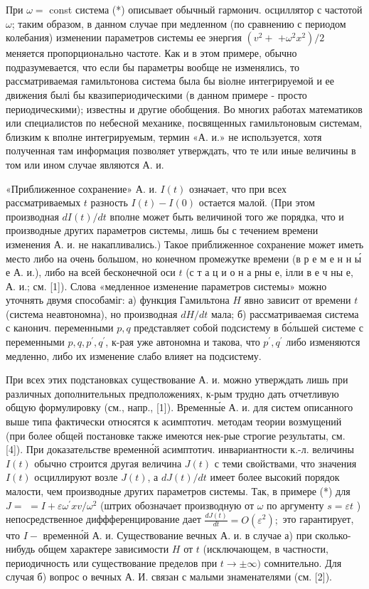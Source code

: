 \documentclass[10pt]{article}
\begin{document}
При $\omega=$ const система (*) описывает обычный гармонич. осциллятор с частотой $\omega$; таким образом, в данном случае при медленном (по сравнению с периодом колебания) изменении параметров системы ее энергия $\left(v^{2}+\right.$ $\left.+\omega^{2} x^{2}\right) / 2$ меняется пропорционально частоте. Как и в этом примере, обычно подразумевается, что если бы параметры вообще не изменялись, то рассматриваемая гамильтонова система была бы віолне интегрируемой и ее движения былі бы квазипериодическими (в данном примере - просто периодическими); известны и другие обобщения. Во многих работах математиков или специалистов по небесной механике, посвященных гамильтоновым системам, близким к вполне интегрируемым, термин «А. и.» не используется, хотя полученная там информация позволяет утверждать, что те или иные величины в том или ином случае являются А. и.



«Приближенное сохранение» А. и. $I(t)$ означает, что при всех рассматриваемых $t$ разность $I(t)-I(0)$ остается малой. (При этом производная $d I(t) / d t$ вполне может быть величиной того же порядка, что и производные других параметров системы, лишь бы с течением времени изменения А. и. не накапливались.) Такое приближенное сохранение может иметь место либо на очень большом, но конечном промежутке времени (в р е м е н н ы́ е А. и.), либо на всей бесконечной оси $t$ (с т а ц и о н а рны е, ілли в е ч ны е, А. и.; см. [1]). Слова «медленное изменение параметров системы» можно уточнять двумя способаміг: а) функция Гамильтона $H$ явно зависит от времени $t$ (система неавтономна), но производная $d H / d t$ мала; б) рассматриваемая система с канонич. переменными $p, q$ представляет собой подсистему в бо́льшей системе с переменными $p, q, p^{\prime}, q^{\prime}$, к-рая уже автономна и такова, что $p^{\prime}, q^{\prime}$ либо изменяются медленно, либо их изменение слабо влияет на подсистему.



При всех этих подстановках существование А. и. можно утверждать лишь при различных дополнительных предположениях, к-рым трудно дать отчетливую общую формулировку (см., напр., [1]). Временны́е А. и. для систем описанного выше типа фактически относятся к асимптотич. методам теории возмущений (при более общей постановке также имеются нек-рые строгие результаты, см. [4]). При доказательстве временно́й асимптотич. инвариантности к.-л. величины $I(t)$ обычно строится другая величина $J(t)$ с теми свойствами, что значения $I(t)$ осциллируют возле $J(t)$, а $d J(t) / d t$ имеет более высокий порядок малости, чем производные других параметров системы. Так, в примере (*) для $J=$ $=I+\varepsilon \omega^{\prime} x v / \omega^{2}$ (штрих обозначает производную от $\omega$ по аргументу $s=\varepsilon t$ ) непосредственное диффференцирование дает $\frac{d J(t)}{d t}=O\left(\varepsilon^{2}\right) ;$ это гарантирует, что $I-$ временно́й А. и. Существование вечных А. и. в случае а) при сколько-нибудь общем характере зависимости $H$ от $t$ (исключающем, в частности, периодичность или существование пределов при $t \rightarrow \pm \infty)$ сомнительно. Для случая б) вопрос о вечных А. И. связан с малыми знаменателями (см. [2]).
\end{document}
